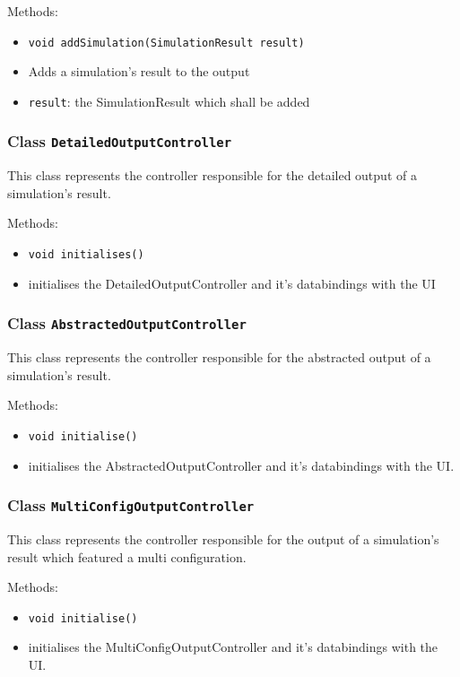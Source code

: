 \documentclass[parskip=full,11pt]{scrartcl}
\begin{document}
Methods:
\begin{itemize}\itemsep -10pt
\item \texttt{void addSimulation(SimulationResult result)}
\item[] Adds a simulation's result to the output
\item[] \texttt{result}: the SimulationResult which shall be added

\end{itemize}

\subsubsection{Class \texttt{DetailedOutputController}}
This class represents the controller responsible for the detailed output of a simulation's result.

Methods:
\begin{itemize}\itemsep -10pt
\item \texttt{void initialises()}
\item[] initialises the DetailedOutputController and it's databindings with the UI
\end{itemize}

\subsubsection{Class \texttt{AbstractedOutputController}}
This class represents the controller responsible for the abstracted output of a simulation's result.

Methods:
\begin{itemize}\itemsep -10pt
\item \texttt{void initialise()}
\item[] initialises the AbstractedOutputController and it's databindings with the UI.
\end{itemize}

\subsubsection{Class \texttt{MultiConfigOutputController}}
This class represents the controller responsible for the output of a simulation's result which featured a multi configuration.

Methods:
\begin{itemize}\itemsep -10pt
\item \texttt{void initialise()}
\item[] initialises the MultiConfigOutputController and it's databindings with the UI.
\end{itemize}
\end{document}
